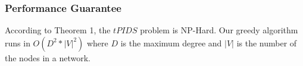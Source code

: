 \subsubsection*{Performance Guarantee}
According to Theorem 1, the $tPIDS$ problem is NP-Hard. Our greedy algorithm runs in $O(D^2*|V|^2)$ where $D$ is the maximum degree and $|V|$ is the number of the nodes in a network. %


%
%




